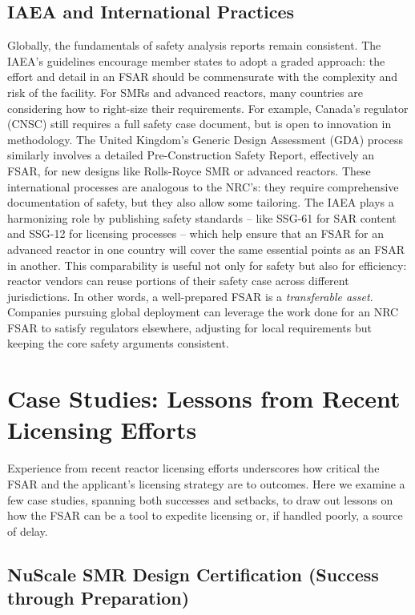 \documentclass[5p,authoryear]{elsarticle}
\begin{document}
\subsection{IAEA and International Practices}
\vspace{0.2cm}

Globally, the fundamentals of safety analysis reports remain consistent. The IAEA's guidelines \cite{IAEA2021} encourage member states to adopt a graded approach: the effort and detail in an FSAR should be commensurate with the complexity and risk of the facility. For SMRs and advanced reactors, many countries are considering how to right-size their requirements. For example, Canada's regulator (CNSC) still requires a full safety case document, but is open to innovation in methodology. The United Kingdom’s Generic Design Assessment (GDA) process similarly involves a detailed Pre-Construction Safety Report, effectively an FSAR, for new designs like Rolls-Royce SMR or advanced reactors. These international processes are analogous to the NRC’s: they require comprehensive documentation of safety, but they also allow some tailoring. The IAEA plays a harmonizing role by publishing safety standards – like SSG-61 for SAR content and SSG-12 for licensing processes – which help ensure that an FSAR for an advanced reactor in one country will cover the same essential points as an FSAR in another. This comparability is useful not only for safety but also for efficiency: reactor vendors can reuse portions of their safety case across different jurisdictions. In other words, a well-prepared FSAR is a \textit{transferable asset}. Companies pursuing global deployment can leverage the work done for an NRC FSAR to satisfy regulators elsewhere, adjusting for local requirements but keeping the core safety arguments consistent.

\section{Case Studies: Lessons from Recent Licensing Efforts}

Experience from recent reactor licensing efforts underscores how critical the FSAR and the applicant's licensing strategy are to outcomes. Here we examine a few case studies, spanning both successes and setbacks, to draw out lessons on how the FSAR can be a tool to expedite licensing or, if handled poorly, a source of delay.

\subsection{NuScale SMR Design Certification (Success through Preparation)}
\vspace{0.2cm}
\end{document}
